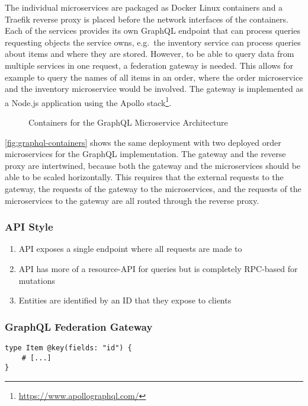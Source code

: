 The individual microservices are packaged as Docker Linux containers and a Traefik reverse proxy is placed before the network interfaces of the containers.
Each of the services provides its own GraphQL endpoint that can process queries requesting objects the service owns, e.g.~the inventory service can process queries about items and where they are stored.
However, to be able to query data from multiple services in one request, a federation gateway is needed.
This allows for example to query the names of all items in an order, where the order microservice and the inventory microservice would be involved.
The gateway is implemented as a Node.js application using the Apollo stack\footnote{\url{https://www.apollographql.com/}}.

\begin{figure}[!htb]
    \centering
    
    \caption{Containers for the GraphQL Microservice Architecture}
    \label{fig:graphql-containers}
\end{figure}

\autoref{fig:graphql-containers} shows the same deployment with two deployed order microservices for the GraphQL implementation.
The gateway and the reverse proxy are intertwined, because both the gateway and the microservices should be able to be scaled horizontally.
This requires that the external requests to the gateway, the requests of the gateway to the microservices, and the requests of the microservices to the gateway are all routed through the reverse proxy.

\subsubsection{\acs{API} Style}

\begin{enumerate}
    \item API exposes a single endpoint where all requests are made to
    \item API has more of a resource-API for queries but is completely RPC-based for mutations
    \item Entities are identified by an ID that they expose to clients
\end{enumerate}

\subsubsection{GraphQL Federation Gateway}

\begin{lstlisting}[caption={Schema Definition to Enable Federation}, language=graphqls]
type Item @key(fields: "id") {
    # [...]
}
\end{lstlisting}

